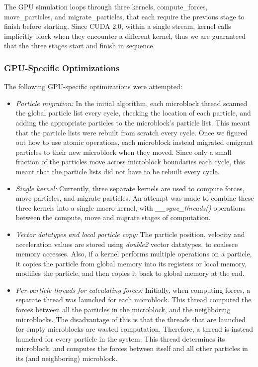 \documentclass[11pt]{article} %
\begin{document}
The GPU simulation loops through three kernels, compute\_forces, move\_particles, and migrate\_particles, that each require the previous stage to finish before starting. Since CUDA 2.0, within a single stream, kernel calls implicitly block when they encounter a different kernel, thus we are guaranteed that the three stages start and finish in sequence. 

\subsubsection{GPU-Specific Optimizations}
\label{gpu-optimization-section}

The following GPU-specific optimizations were attempted:

\begin{itemize}
\item {\em Particle migration: } In the initial algorithm, each microblock thread scanned the global particle list every cycle, checking the location of each particle, and adding the appropriate particles to the microblock's particle list. This meant that the particle lists were rebuilt from scratch every cycle. Once we figured out how to use atomic operations, each microblock instead migrated emigrant particles to their new microblock when they moved. Since only a small fraction of the particles move across microblock boundaries each cycle, this meant that the particle lists did not have to be rebuilt every cycle.

\item {\em Single kernel: } Currently, three separate kernels are used to compute forces, move particles, and migrate particles. An attempt was made to combine these three kernels into a single macro-kernel, with {\em \_\_sync\_threads()} operations between the compute, move and migrate stages of computation.

\item {\em Vector datatypes and local particle copy: } The particle position, velocity and acceleration values are stored using {\em double2} vector datatypes, to coalesce memory accesses. Also, if a kernel performs multiple operations on a particle, it copies the particle from global memory into its registers or local memory, modifies the particle, and then copies it back to global memory at the end.

\item {\em Per-particle threads for calculating forces: } Initially, when computing forces, a separate thread was launched for each microblock. This thread computed the forces between all the particles in the microblock, and the neighboring microblocks. The disadvantage of this is that the threads that are launched for empty microblocks are wasted computation. Therefore, a thread is instead launched for every particle in the system. This thread determines its microblock, and computes the forces between itself and all other particles in its (and neighboring) microblock.


\end{itemize}
\end{document}
